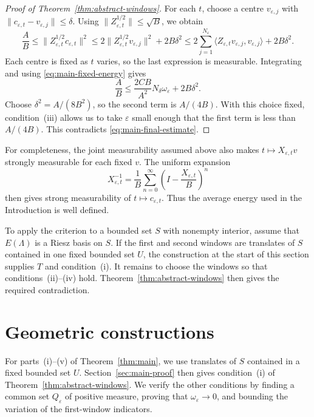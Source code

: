 \documentclass[12pt,reqno,tbtags]{amsart}
\newcommand\norm[1]{\|#1\|}
\newcommand\inpro[2]{\langle #1,#2\rangle}
\newcommand\1{\mathbbm{1}}
\newcommand{\eps}{\varepsilon}
\begin{document}
\begin{proof}[Proof of Theorem~\ref{thm:abstract-windows}]
For each $t$, choose a centre $v_{\eps,j}$ with
$\norm{c_{\eps,t}-v_{\eps,j}}\le\delta$.
Using $\norm{Z_{\eps,t}^{1/2}}\le\sqrt B$, we obtain
\begin{equation*}
    \frac AB
    \le\norm{Z_{\eps,t}^{1/2}c_{\eps,t}}^2
    \le2\norm{Z_{\eps,t}^{1/2}v_{\eps,j}}^2+2B\delta^2
    \le2\sum_{j=1}^{N_\eps}
       \inpro{Z_{\eps,t}v_{\eps,j}}{v_{\eps,j}}+2B\delta^2.
\end{equation*}
Each centre is fixed as $t$ varies, so the last expression is measurable.
Integrating and using \eqref{eq:main-fixed-energy} gives
\begin{equation}\label{eq:main-final-estimate}
    \frac AB
    \le\frac{2CB}{A^2}N_\delta\omega_\eps+2B\delta^2.
\end{equation}
Choose $\delta^2=A/(8B^2)$, so the second term is $A/(4B)$.
With this choice fixed, condition~(iii) allows us to take $\eps$ small enough
that the first term is less than $A/(4B)$.
This contradicts \eqref{eq:main-final-estimate}.
\end{proof}

For completeness, the joint measurability assumed above also makes
$t\mapsto X_{\eps,t}v$ strongly measurable for each fixed $v$.
The uniform expansion
\begin{equation*}
    X_{\eps,t}^{-1}=\frac1B\sum_{n=0}^{\infty}
    \left(I-\frac{X_{\eps,t}}B\right)^n
\end{equation*}
then gives strong measurability of $t\mapsto c_{\eps,t}$.
Thus the average energy used in the Introduction is well defined.

To apply the criterion to a bounded set $S$ with nonempty interior, assume
that $E(\Lambda)$ is a Riesz basis on $S$. If the first and second windows
are translates of $S$ contained in one fixed bounded set $U$, the construction
at the start of this section supplies $T$ and condition~(i).
It remains to choose the windows so that conditions~(ii)--(iv) hold.
Theorem~\ref{thm:abstract-windows} then gives the required contradiction.

\section{Geometric constructions}\label{sec:3}

For parts~(i)--(v) of Theorem~\ref{thm:main}, we use translates of $S$
contained in a fixed bounded set $U$.
Section~\ref{sec:main-proof} then gives condition~(i) of
Theorem~\ref{thm:abstract-windows}.
We verify the other conditions by finding a common set $Q_\eps$ of positive
measure, proving that $\omega_\eps\to0$, and bounding the variation of the
first-window indicators.
\end{document}

